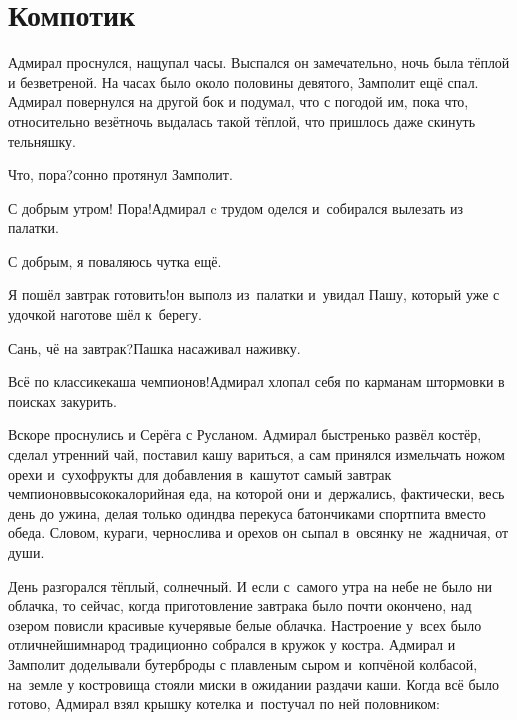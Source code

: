 \chapter{Компотик}
\vepsianrose

Адмирал проснулся, нащупал часы. Выспался он замечательно, ночь была тёплой и безветреной. На часах было около половины девятого, Замполит ещё спал. Адмирал повернулся на другой бок и подумал, что с погодой им, пока что, относительно везёт\mdash ночь выдалась такой тёплой, что пришлось даже скинуть тельняшку.

\diagdash Что, пора?\mdash сонно протянул Замполит.

\diagdash С добрым утром! Пора!\mdash Адмирал c трудом оделся и~собирался вылезать из палатки.

\diagdash С добрым, я поваляюсь чутка ещё.

\diagdash Я пошёл завтрак готовить!\mdash он выполз из~палатки и~увидал Пашу, который уже с удочкой наготове шёл к~берегу.

\diagdash Сань, чё на завтрак?\mdash Пашка насаживал наживку.

\diagdash Всё по классике\mdash каша чемпионов!\mdash Адмирал хлопал себя по карманам штормовки в поисках закурить.

Вскоре проснулись и Серёга с Русланом. Адмирал быстренько развёл костёр, сделал утренний чай, поставил кашу вариться, а сам принялся измельчать ножом орехи и~сухофрукты для добавления в~кашу\mdash тот самый завтрак чемпионов\mdash высококалорийная еда, на которой они и~держались, фактически, весь день до ужина, делая только один\sdash два перекуса батончиками спортпита вместо обеда. Словом, кураги, чернослива и орехов он сыпал в~овсянку не~жадничая, от души.

День разгорался тёплый, солнечный. И если с~самого утра на небе не было ни облачка, то сейчас, когда приготовление завтрака было почти окончено, над озером повисли красивые кучерявые белые облачка. Настроение у~всех было отличнейшим\mdash народ традиционно собрался в кружок у костра. Адмирал и Замполит доделывали бутерброды с плавленым сыром и~копчёной колбасой, на~земле у костровища стояли миски в ожидании раздачи каши. Когда всё было готово, Адмирал взял крышку котелка и~постучал по ней половником:

